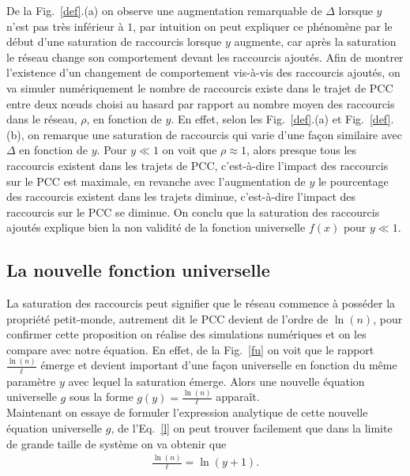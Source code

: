 De la Fig.~\ref{def}.(a) on observe une augmentation remarquable de $\Delta$ lorsque
$y$ n'est pas très inférieur à $1$, par intuition on peut expliquer ce phénomène par le début d'une saturation de raccourcis lorsque $y$ augmente, car après la saturation le réseau change son comportement devant les raccourcis ajoutés. Afin de montrer l'existence d'un changement de comportement vis-à-vis des raccourcis ajoutés, on va simuler numériquement le nombre de raccourcis existe dans le trajet de PCC entre deux nœuds choisi au hasard par rapport au nombre moyen des raccourcis dans le réseau, $\rho$, en fonction de $y$. En effet, selon les Fig.~\ref{def}.(a) et Fig.~\ref{def}.(b), on remarque une saturation de raccourcis qui varie d'une façon similaire avec $\Delta$ en fonction de $y$. Pour $y\ll1$ on voit que $\rho\approx1$, alors presque tous les raccourcis existent dans les trajets de PCC, c'est-à-dire l'impact des raccourcis sur le PCC est maximale, en revanche avec l'augmentation de $y$ le pourcentage des raccourcis existent dans les trajets diminue, c'est-à-dire l'impact des raccourcis sur le PCC se diminue.
On conclu que la saturation des raccourcis ajoutés explique bien la non validité de la fonction universelle $f(x)$ pour  $y\ll1$.\\
 
\subsection{La nouvelle fonction universelle }
La saturation des raccourcis peut signifier que le réseau commence à posséder la propriété petit-monde,
autrement dit le PCC devient de l'ordre de $\ln(n)$, pour confirmer cette proposition on réalise des simulations numériques et on  les compare avec notre équation. En effet, de la Fig.~\ref{fu} on voit que le rapport
$\frac{\ln(n)}{\ell}$ émerge et devient important d'une façon universelle en fonction du même paramètre $y$ avec lequel la saturation émerge. Alors une nouvelle équation universelle $g$ sous la forme $g(y)=\frac{\ln(n)}{\ell}$ apparaît.\\

Maintenant on essaye de formuler l'expression analytique de cette nouvelle équation universelle $g$, de l'Eq.~\ref{l} on peut trouver facilement que dans la limite de grande taille de système on va obtenir que
\begin{eqnarray}
\frac{\ln(n)}{\ell}=\ln(y+1).
\label{kp1}
\end{eqnarray}

